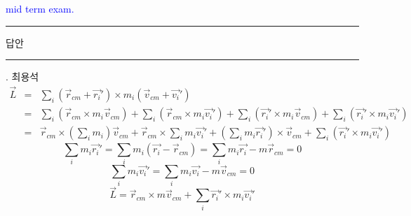 \documentclass[a4paper,11pt,fleqn]{article}
\newcommand{\n}{\newline}
\begin{document}
\textcolor{blue}{mid term exam.} \n
\rule{\linewidth}{1pt}
\n
답안  \n 
\rule{\linewidth}{0.8pt}
.
\n
최용석
\n
\begin{eqnarray*}
	\vec{L} &=& \sum_i ( \vec{r}_{cm} + \vec{r_i }' ) \times m_i ( \vec{v}_{cm} + \vec{v_i }')\\
	&=& \sum_i ( \vec{r}_{cm} \times m_i \vec{v}_{cm}) + \sum_i ( \vec{r}_{cm} \times m_i \vec{v_i}')
	+ \sum_i ( \vec{r_i}' \times m_i \vec{v}_{cm} ) + \sum_i ( \vec{r_i}' \times m_i \vec{v_i}')\\
	&=& \vec{r}_{cm} \times \left( \sum_i m_i \right) \vec{v}_{cm} + \vec{r}_{cm}\times \sum_i m_i \vec{v_i}' 
	+ \left( \sum_i m_i \vec{r_i}' \right) \times \vec{v}_{cm} + \sum_i ( \vec{r_i}' \times m_i \vec{v_i}')
\end{eqnarray*}
\[
	\sum_i m_i \vec{r_i}' = \sum_i m_i ( \vec{r_i} - \vec{r}_{cm} ) = \sum_i m_i \vec{r_i} - m \vec{r}_{cm} = 0
\]
\[
	\sum_i m_i \vec{v_i}' = \sum_i m_i \vec{v_i} - m \vec{v}_{cm} = 0
\]
\[
	\vec{L} = \vec{r}_{cm} \times m \vec{v}_{cm} + \sum_i \vec{r_i}' \times m_i \vec{v_i}'
\]
\end{document}
